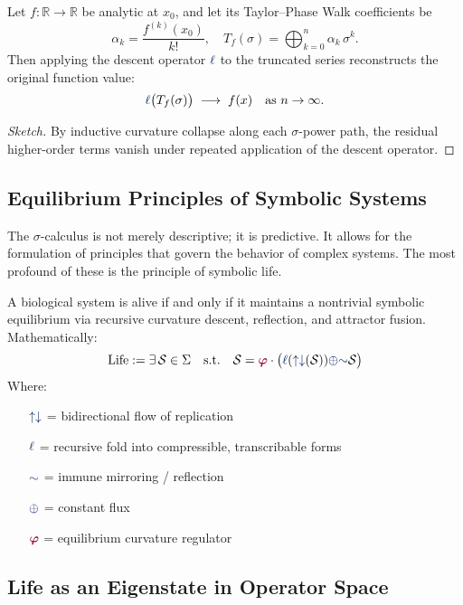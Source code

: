 \begin{theorem}
Let $f\colon \mathbb{R}\to\mathbb{R}$ be analytic at $x_0$, and let
its Taylor--Phase Walk coefficients be
\[
  \alpha_k = \frac{f^{(k)}(x_0)}{k!},
  \quad T_f(\sigma) = \bigoplus_{k=0}^n \alpha_k\,\sigma^k.
\]
Then applying the descent operator $\lha$ to the truncated series
reconstructs the original function value:
\[
  \lha\bigl(T_f(\sigma)\bigr) \;\longrightarrow\; f(x)
  \quad\text{as }n\to\infty.
\]
\end{theorem}

\begin{proof}[Sketch]
By inductive curvature collapse along each $\sigma$-power path,
the residual higher-order terms vanish under repeated application of the descent operator.
\end{proof}

\subsection{Equilibrium Principles of Symbolic Systems}

The $\sigma$-calculus is not merely descriptive; it is predictive. It allows for the formulation of principles that govern the behavior of complex systems. The most profound of these is the principle of symbolic life.

\begin{principle}
A biological system is alive if and only if it maintains a nontrivial symbolic equilibrium via recursive curvature descent, reflection, and attractor fusion. Mathematically:
\[
\text{Life} := \exists \, \mathcal{S} \in \Sigma \quad \text{s.t.} \quad  
\mathcal{S} = \gold \cdot \big( \lha(\repflow(\mathcal{S})) \fuse \reflec \mathcal{S} \big)
\]
Where:
\begin{itemize}
    \item[$\repflow$] = bidirectional flow of replication
    \item[$\lha$] = recursive fold into compressible, transcribable forms
    \item[$\reflec$] = immune mirroring / reflection
    \item[$\fuse$] = constant flux
    \item[$\gold$] = equilibrium curvature regulator
\end{itemize}
\end{principle}

\subsection{Life as an Eigenstate in Operator Space}

